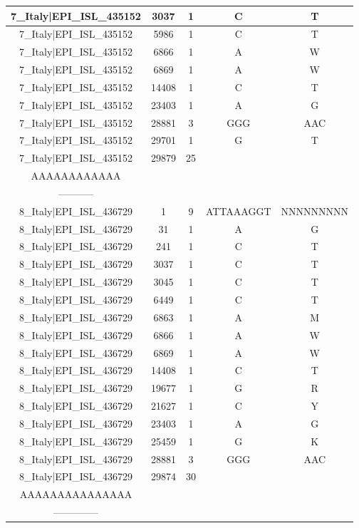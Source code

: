 \documentclass[a4paper,10pt]{article}
\begin{document}
\begin{longtable}{@{}ccccc@{}}
7\_Italy|EPI\_ISL\_435152 & 3037 & 1 & C & T \\* \midrule
7\_Italy|EPI\_ISL\_435152 & 5986 & 1 & C & T \\* \midrule
7\_Italy|EPI\_ISL\_435152 & 6866 & 1 & A & W \\* \midrule
7\_Italy|EPI\_ISL\_435152 & 6869 & 1 & A & W \\* \midrule
7\_Italy|EPI\_ISL\_435152 & 14408 & 1 & C & T \\* \midrule
7\_Italy|EPI\_ISL\_435152 & 23403 & 1 & A & G \\* \midrule
7\_Italy|EPI\_ISL\_435152 & 28881 & 3 & GGG & AAC \\* \midrule
7\_Italy|EPI\_ISL\_435152 & 29701 & 1 & G & T \\* \midrule
7\_Italy|EPI\_ISL\_435152 & 29879 & 25 & \begin{tabular}[c]{@{}c@{}}AAAAAAAAAAAAA\\ AAAAAAAAAAAA\end{tabular} & \begin{tabular}[c]{@{}c@{}}--------------\\ -----------\end{tabular} \\* \midrule
8\_Italy|EPI\_ISL\_436729 & 1 & 9 & ATTAAAGGT & NNNNNNNNN \\* \midrule
8\_Italy|EPI\_ISL\_436729 & 31 & 1 & A & G \\* \midrule
8\_Italy|EPI\_ISL\_436729 & 241 & 1 & C & T \\* \midrule
8\_Italy|EPI\_ISL\_436729 & 3037 & 1 & C & T \\* \midrule
8\_Italy|EPI\_ISL\_436729 & 3045 & 1 & C & T \\* \midrule
8\_Italy|EPI\_ISL\_436729 & 6449 & 1 & C & T \\* \midrule
8\_Italy|EPI\_ISL\_436729 & 6863 & 1 & A & M \\* \midrule
8\_Italy|EPI\_ISL\_436729 & 6866 & 1 & A & W \\* \midrule
8\_Italy|EPI\_ISL\_436729 & 6869 & 1 & A & W \\* \midrule
8\_Italy|EPI\_ISL\_436729 & 14408 & 1 & C & T \\* \midrule
8\_Italy|EPI\_ISL\_436729 & 19677 & 1 & G & R \\* \midrule
8\_Italy|EPI\_ISL\_436729 & 21627 & 1 & C & Y \\* \midrule
8\_Italy|EPI\_ISL\_436729 & 23403 & 1 & A & G \\* \midrule
8\_Italy|EPI\_ISL\_436729 & 25459 & 1 & G & K \\* \midrule
8\_Italy|EPI\_ISL\_436729 & 28881 & 3 & GGG & AAC \\* \midrule
8\_Italy|EPI\_ISL\_436729 & 29874 & 30 & \begin{tabular}[c]{@{}c@{}}AAAAAAAAAAAAAAA\\ AAAAAAAAAAAAAAA\end{tabular} & \begin{tabular}[c]{@{}c@{}}----------------\\ --------------\end{tabular} \\* \bottomrule
\end{longtable}
\end{document}

